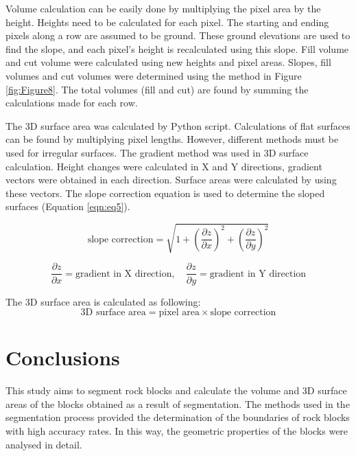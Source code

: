 \documentclass[a4paper,fleqn]{cas-sc}
\begin{document}
Volume calculation can be easily done by multiplying the pixel area by the height. Heights need to be calculated for each pixel. The starting and ending pixels along a row are assumed to be ground. These ground elevations are used to find the slope, and each pixel's height is recalculated using this slope. Fill volume and cut volume were calculated using new heights and pixel areas. Slopes, fill volumes and cut volumes were determined using the method in Figure \ref{fig:Figure8}. The total volumes (fill and cut) are found by summing the calculations made for each row.

The 3D surface area was calculated by Python script. Calculations of flat surfaces can be found by multiplying pixel lengths. However, different methods must be used for irregular surfaces. The gradient method was used in 3D surface calculation. Height changes were calculated in X and Y directions, gradient vectors were obtained in each direction. Surface areas were calculated by using these vectors. The slope correction equation is used to determine the sloped surfaces (Equation \ref{eqn:eq5}).

\begin{equation}
\label{eqn:eq5}
\text{slope correction} = \sqrt{1 + \left(\frac{\partial z}{\partial x}\right)^2 + \left(\frac{\partial z}{\partial y}\right)^2}
\end{equation}

\begin{equation}
\label{eqn:eq6}
\frac{\partial z}{\partial x} = \text{gradient in X direction}, \quad \frac{\partial z}{\partial y} = \text{gradient in Y direction}
\end{equation}

The 3D surface area is calculated as following:
\begin{equation}
\label{eqn:eq7}
\text{3D surface area} = \text{pixel area} \times \text{slope correction}
\end{equation}


\section{Conclusions}

This study aims to segment rock blocks and calculate the volume and 3D surface areas of the blocks obtained as a result of segmentation. The methods used in the segmentation process provided the determination of the boundaries of rock blocks with high accuracy rates. In this way, the geometric properties of the blocks were analysed in detail.
\end{document}
